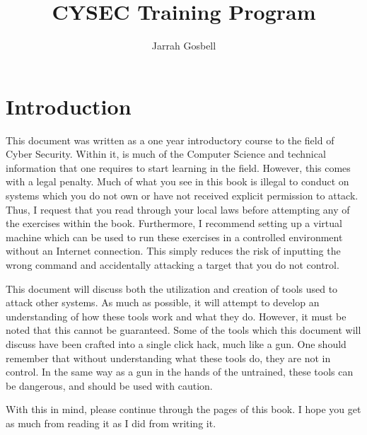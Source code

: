 \documentclass[twoside,a4paper,11pt]{report}
\author{Jarrah Gosbell}
\title{CYSEC Training Program}
\begin{document}
\frontmatter
\maketitle
\tableofcontents
	\listoffigures
	\listoftables
	{%
	 \renewcommand{\figurename}{Code Example}
	 }
\chapter{Introduction}
	This document was written as a one year introductory course to the field of Cyber Security. 
	Within it, is much of the Computer Science and technical information that one requires to start learning in the field. 
	However, this comes with a legal penalty. 
	Much of what you see in this book is illegal to conduct on systems which you do not own or have not received explicit permission to attack. 
	Thus, I request that you read through your local laws before attempting any of the exercises within the book. 
	Furthermore, I recommend setting up a virtual machine which can be used to run these exercises in a controlled environment without an Internet connection. 
	This simply reduces the risk of inputting the wrong command and accidentally attacking a target that you do not control. 

	This document will discuss both the utilization and creation of tools used to attack other systems. 
	As much as possible, it will attempt to develop an understanding of how these tools work and what they do. 
	However, it must be noted that this cannot be guaranteed. 
	Some of the tools which this document will discuss have been crafted into a single click hack, much like a gun. 
	One should remember that without understanding what these tools do, they are not in control. 
	In the same way as a gun in the hands of the untrained, these tools can be dangerous, and should be used with caution. 

	With this in mind, please continue through the pages of this book. 
	I hope you get as much from reading it as I did from writing it. 
\end{document}
